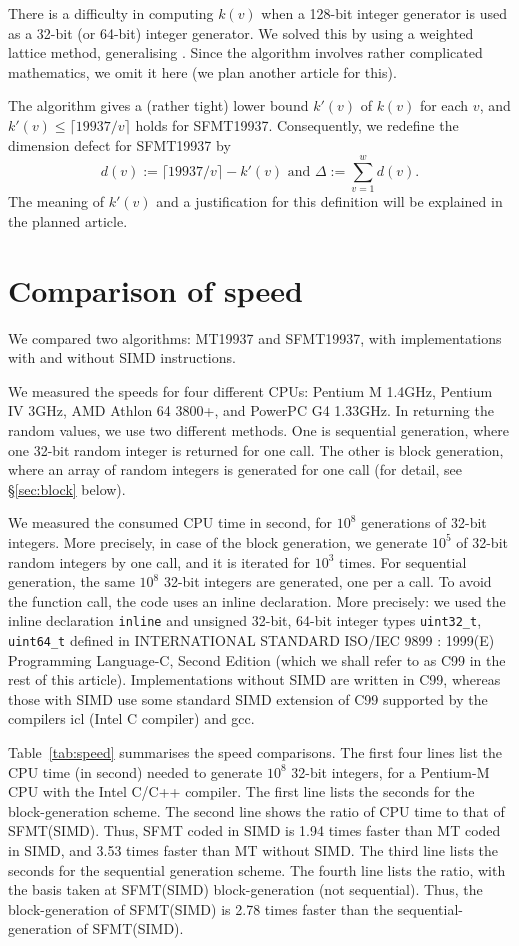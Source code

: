 \documentclass[acmnow]{acmtrans2m}
\begin{document}
There is a difficulty in computing $k(v)$ when 
a 128-bit integer generator is used as a 32-bit 
(or 64-bit) integer generator.
We solved this by using a weighted lattice method,
generalising \cite{CLT}. Since the algorithm involves
rather complicated mathematics, we omit it here
(we plan another article for this). 

The algorithm gives a (rather tight) 
lower bound $k'(v)$ of $k(v)$ for each $v$, 
and $k'(v) \leq \lceil 19937/v \rceil$ holds
for SFMT19937.
Consequently, we redefine the dimension defect for SFMT19937 by
$$
d(v):=\lceil 19937/v \rceil - k'(v) 
\mbox{ and } \Delta:=\sum_{v=1}^w d(v).
$$
The meaning of $k'(v)$ and a justification for this 
definition will be explained in the planned article.

\section{Comparison of  speed}\label{sec:comp-speed}
We compared two algorithms: MT19937 and SFMT19937,
with implementations with and without SIMD instructions.

We measured the speeds for four different CPUs:
Pentium M 1.4GHz, Pentium IV 3GHz, 
AMD Athlon 64 3800+, and PowerPC G4 1.33GHz.  
In returning the random values, we use two different methods.
One is sequential generation, where one 32-bit random 
integer is returned for one call. 
The other is block generation, where an array
of random integers is generated for one call (for 
detail, see \S\ref{sec:block} below). 

We measured the consumed CPU time in second, 
for $10^8$ generations of 32-bit integers. More precisely,
in case of the block generation, we generate $10^5$
of 32-bit random integers by one call, and it is iterated
for $10^3$ times. 
For sequential generation, the same $10^8$
 32-bit integers are generated, one per a call.
To avoid the function call, the code uses 
an inline declaration. 
More precisely: we used the inline declaration
{\tt inline}
and unsigned 32-bit, 64-bit integer types 
{\tt uint32\_t}, {\tt uint64\_t} defined in 
INTERNATIONAL STANDARD ISO/IEC 9899 : 1999(E) 
Programming Language-C, Second Edition
(which we shall refer to as C99 in the rest of this article).
Implementations without SIMD are written in C99,
whereas those with SIMD use
some standard SIMD extension of C99 supported by 
the compilers icl (Intel C compiler) and gcc.

Table~\ref{tab:speed} summarises the speed comparisons.
 The first four lines list the CPU time
(in second) needed to generate $10^8$ 
32-bit integers, for a Pentium-M CPU with the Intel C/C++
compiler. The first line lists the seconds for the
block-generation scheme. The second line shows the 
ratio of CPU time to that of 
SFMT(SIMD). Thus, SFMT coded in SIMD is 1.94 times
faster than MT coded in SIMD, and 3.53 times faster
than MT without SIMD. The third line lists the seconds
for the sequential generation scheme. The fourth line
lists the ratio, with the basis taken
at SFMT(SIMD) block-generation (not sequential). 
Thus, the block-generation of SFMT(SIMD) is 2.78 times
faster than the sequential-generation of SFMT(SIMD).
\end{document}
